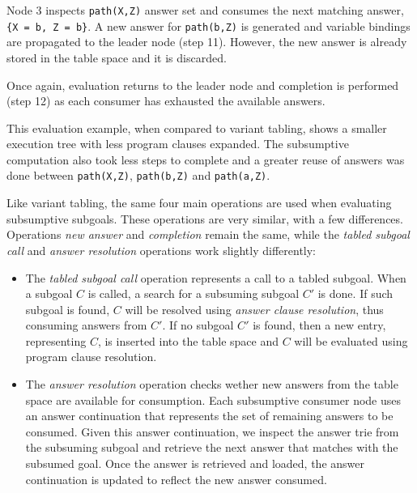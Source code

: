 Node 3 inspects \texttt{path(X,Z)} answer set and consumes the next matching answer, \texttt{\{X~=~b,~Z~=~b\}}.
A new answer for \texttt{path(b,Z)} is generated and variable bindings are propagated to the leader node (step 11).
However, the new answer is already stored in the table space and it is discarded.

Once again, evaluation returns to the leader node and completion is performed (step 12) as each consumer has exhausted the
available answers.

This evaluation example, when compared to variant tabling, shows a smaller execution tree with less
program clauses expanded. The subsumptive computation also took less steps to complete and a greater
reuse of answers was done between \texttt{path(X,Z)}, \texttt{path(b,Z)} and \texttt{path(a,Z)}.


Like variant tabling, the same four main operations are used when evaluating subsumptive subgoals.
These operations are very similar, with a few differences. Operations \textit{new answer} and
\textit{completion} remain the same, while the \textit{tabled subgoal call} and \textit{answer resolution}
operations work slightly differently:

\begin{itemize}
\item The \textit{tabled subgoal call} operation represents a call to a tabled subgoal.
When a subgoal $C$ is called, a search for a subsuming subgoal $C'$ is done. If such subgoal is found,
$C$ will be resolved using \textit{answer clause resolution}, thus consuming answers from $C'$.
If no subgoal $C'$ is found, then a new entry, representing $C$, is inserted into the table space and
$C$ will be evaluated using program clause resolution.

\item The \textit{answer resolution} operation checks wether new answers from the table space are
available for consumption. Each subsumptive consumer node uses an answer continuation that represents
the set of remaining answers to be consumed. Given this answer continuation, we inspect the answer trie
from the subsuming subgoal and retrieve the next answer that matches with the subsumed goal. Once the
answer is retrieved and loaded, the answer continuation is updated to reflect the new answer consumed.

\end{itemize}

